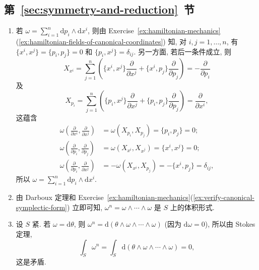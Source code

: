 \subsection{\texorpdfstring{第~\ref{sec:symmetry-and-reduction}~节}{对称性与约化}}\label{subsec:solutions-symmetry-and-reduction}

\begin{description}[font=\normalfont,leftmargin=2em,labelwidth=1.5em]
\begin{enumerate}[label=(\alph*),ref=\alph*,leftmargin=*]
\item 若 $\omega=\sum_{i=1}^n\mathrm{d}p_i\wedge\mathrm{d}x^i$, 则由 Exercise~\ref{ex:hamiltonian-mechanics}(\ref{ex:hamiltonian-fields-of-canonical-coordinates}) 知, 对 $i,j=1,\ldots,n$, 有 $\{x^i,x^j\}=\{p_i,p_j\}=0$ 和 $\{p_i,x^j\}=\delta_{ij}$. 另一方面, 若后一条件成立, 则
\[
  X_{x^i}=\sum_{j=1}^n\left(\{x^i,x^j\}\frac{\partial}{\partial x^j}
                  +\{x^i,p_j\}\frac{\partial}{\partial p_j}\right)
               =-\frac{\partial}{\partial p_i}
\]
及
\[
  X_{p_i}=\sum_{j=1}^n\left(\{p_i,x^j\}\frac{\partial}{\partial x^j}
                  +\{p_i,p_j\}\frac{\partial}{\partial p_j}\right)
               =\frac{\partial}{\partial x^i},
\]
这蕴含
\begin{align*}
  \omega\left(\frac{\partial}{\partial x^i},\frac{\partial}{\partial x^j}\right)
   &=\omega(X_{p_i},X_{p_j})=\{p_i,p_j\}=0;\\
  \omega\left(\frac{\partial}{\partial p_i},\frac{\partial}{\partial p_j}\right)
   &=\omega(X_{x^i},X_{x^j})=\{x^i,x^j\}=0;\\
  \omega\left(\frac{\partial}{\partial p_i},\frac{\partial}{\partial x^j}\right)
   &=-\omega(X_{x^i},X_{p_j})=-\{x^i,p_j\}=\delta_{ij},
\end{align*}
所以 $\omega=\sum_{i=1}^n\mathrm{d}p_i\wedge\mathrm{d}x^i$.
\item 由 Darboux 定理和 Exercise~\ref{ex:hamiltonian-mechanics}(\ref{ex:verify-canonical-symplectic-form}) 立即可知, $\omega^n=\omega\wedge\cdots\wedge\omega$ 是 $S$ 上的体积形式.
\item 设 $S$ 紧. 若 $\omega=\mathrm{d}\theta$, 则 $\omega^n=\mathrm{d}(\theta\wedge\omega\wedge\cdots\wedge\omega)$ (因为 $\mathrm{d}\omega=0$), 所以由 Stokes 定理,
\[
  \int_S\omega^n=\int_S\mathrm{d}(\theta\wedge\omega\wedge\cdots\wedge\omega)=0,
\]
这是矛盾.
\end{enumerate}


\end{description}
